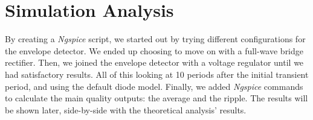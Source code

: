 \section{Simulation Analysis}
\label{sec:simulation}

By creating a \textit{Ngspice} script, we started out by trying different configurations for the envelope detector. We ended up choosing to move on with a full-wave bridge rectifier.
Then, we joined the envelope detector with a voltage regulator until we had satisfactory results. All of this looking at 10 periods after the initial transient period, and using the default diode model.
Finally, we added \textit{Ngspice} commands to calculate the main quality outputs: the average and the ripple. The results will be shown later, side-by-side with the theoretical analysis' results.




